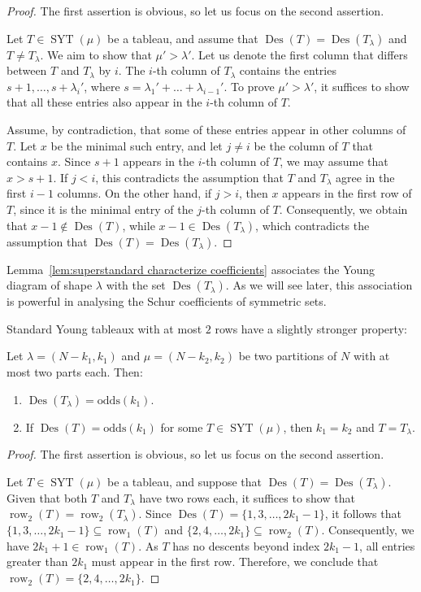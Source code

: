 \documentclass[ALCO]{cedram}
\newcommand{\Des}{\operatorname{Des}}
\newcommand{\Syt}{\operatorname{SYT}}
\newcommand{\row}{\operatorname{row}}
\newcommand{\odds}{\mathrm{odds}}
\begin{document}
\begin{proof}
    The first assertion is obvious, so let us focus on the second assertion.
    
    Let $T \in \Syt(\mu)$ be a tableau, and assume that $\Des(T) = \Des(T_\lambda)$ and $T \ne T_\lambda$. We aim to show that $\mu' > \lambda'$. Let us denote the first column that differs between $T$ and $T_\lambda$ by $i$. The $i$-th column of $T_\lambda$ contains the entries $s+1,\dots,s+\lambda_{i}'$, where $s = \lambda_1' + \dots + \lambda_{i-1}'$. To prove $\mu' > \lambda'$, it suffices to show that all these entries also appear in the $i$-th column of $T$.
    
    Assume, by contradiction, that some of these entries appear in other columns of $T$. Let $x$ be the minimal such entry, and let $j \ne i$ be the column of $T$ that contains $x$. Since $s+1$ appears in the $i$-th column of $T$, we may assume that $x > s+1$. If $j < i$, this contradicts the assumption that $T$ and $T_\lambda$ agree in the first $i-1$ columns. On the other hand, if $j > i$, then $x$ appears in the first row of $T$, since it is the minimal entry of the $j$-th column of $T$. Consequently, we obtain that $x-1 \notin \Des(T)$, while $x-1 \in \Des(T_\lambda)$, which contradicts the assumption that $\Des(T) = \Des(T_\lambda)$.
\end{proof}

Lemma~\ref{lem:superstandard characterize coefficients} associates the Young diagram of shape $\lambda$ with the set $\Des(T_\lambda)$. As we will see later, this association is powerful in analysing the Schur coefficients of symmetric sets.


Standard Young tableaux with at most $2$ rows have a slightly stronger property:
\begin{lemma}
\label{lem:superstandard two rows characterize coefficients}
    Let $\lambda = (N-k_1,k_1)$ and $\mu = (N-k_2,k_2)$ be two partitions of $N$ with at most two parts each. Then:
    \begin{enumerate}
        \item $\Des(T_\lambda) = \odds(k_1)$.
        \item If $\Des(T) = \odds(k_1)$ for some $T \in \Syt(\mu)$, then $k_1 = k_2$ and $T = T_\lambda$.
    \end{enumerate}
\end{lemma}

    

\begin{proof}
    The first assertion is obvious, so let us focus on the second assertion.

    Let $T \in \Syt(\mu)$ be a tableau, and suppose that $\Des(T) = \Des(T_\lambda)$. Given that both $T$ and $T_\lambda$ have two rows each, it suffices to show that $\row_2(T) = \row_2(T_\lambda)$. Since $\Des(T) = \{1,3,\dots,2k_1-1\}$, it follows that $\{1,3,\dots,2k_1-1\} \subseteq \row_1(T)$ and $\{2,4,\dots,2k_1\} \subseteq \row_2(T)$. Consequently, we have $2k_1+1 \in \row_1(T)$. As $T$ has no descents beyond index $2k_1-1$, all entries greater than $2k_1$ must appear in the first row. Therefore, we conclude that $\row_2(T) = \{2,4,\dots,2k_1\}$.
\end{proof}
\end{document}

